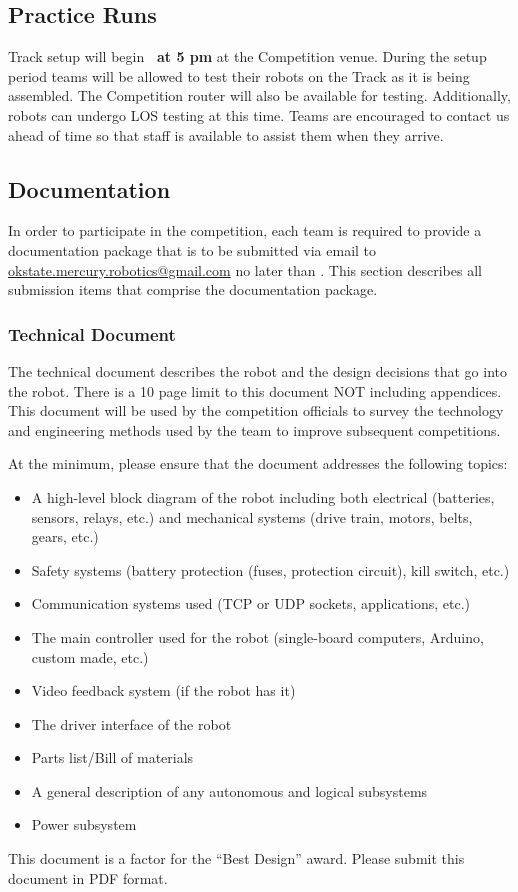 \subsection{Practice Runs}
Track setup will begin \textbf{\los \ at 5 pm} at the Competition venue. During the setup period teams will be allowed to test their robots on the Track as it is being assembled. The Competition router will also be available for testing. Additionally, robots can undergo LOS testing at this time. Teams are encouraged to contact us ahead of time so that staff is available to assist them when they arrive.

\subsection{Documentation}
In order to participate in the competition, each team is required to provide a documentation package that is to be submitted via email to \href{mailto:okstate.mercury.robotics@gmail.com}{ okstate.mercury.robotics@gmail.com} no later than \textbf{\documentation}. This section describes all submission items that comprise the documentation package.

\subsubsection{Technical Document}
The technical document describes the robot and the design decisions that go into the robot. There is a 10 page limit to this document NOT including appendices. This document will be used by the competition officials to survey the technology and engineering methods used by the team to improve subsequent competitions. 

At the minimum, please ensure that the document addresses the following topics:

\begin{itemize}
\item A high-level block diagram of the robot including both electrical (batteries, sensors, relays, etc.) and mechanical systems (drive train, motors, belts, gears, etc.)
\item Safety systems (battery protection (fuses, protection circuit), kill switch, etc.)
\item Communication systems used (TCP or UDP sockets, applications, etc.)
\item The main controller used for the robot (single-board computers, Arduino, custom made, etc.)
\item Video feedback system (if the robot has it)
\item The driver interface of the robot
\item Parts list/Bill of materials
\item A general description of any autonomous and logical subsystems
\item Power subsystem	
\end{itemize}
This document is a factor for the “Best Design” award. Please submit this document in PDF format.
